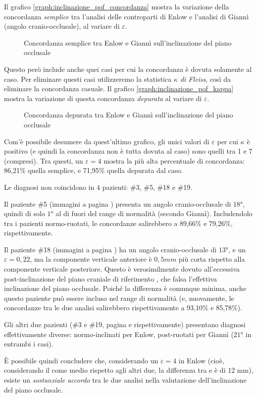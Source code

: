 Il grafico \vref{graph:inclinazione_pof_concordanza} mostra la variazione della concordanza \emph{semplice} tra l'analisi delle controparti di Enlow e l'analisi di Giannì (angolo cranio-occlusale), al variare di $\varepsilon$.

\begin{figure}[ht!]
\centering

\caption{Concordanza semplice tra Enlow e Giannì sull'inclinazione del piano occlusale}
\label{graph:inclinazione_pof_concordanza}
\end{figure}

Questo però include anche quei casi per cui la concordanza è dovuta solamente al caso. Per eliminare questi casi utilizzeremo la statistica \emph{$\kappa$ di Fleiss}, così da eliminare la concordanza casuale. Il grafico \vref{graph:inclinazione_pof_kappa} mostra la variazione di questa concordanza \emph{depurata} al variare di $\varepsilon$.

\begin{figure}[ht!]
\centering

\caption{Concordanza depurata tra Enlow e Giannì sull'inclinazione del piano occlusale}
\label{graph:inclinazione_pof_kappa}
\end{figure}

Com'è possibile desumere da quest'ultimo grafico, gli unici valori di $\varepsilon$ per cui $\kappa$ è positivo (e quindi la concordanza non è tutta dovuta al caso) sono quelli tra 1 e 7 (compresi). Tra questi, un $\varepsilon = 4$ mostra la più alta percentuale di concordanza: 86,21\% quella semplice, e 71,95\% quella depurata dal caso.

Le diagnosi non coincidono in $4$ pazienti: \#3, \#5, \#18 e \#19.

Il paziente \#5 (immagini a pagina \pageref{paz:EMALO2001}) presenta un angolo cranio-occlusale di $18°$, quindi di solo $1°$ al di fuori del range di normalità (secondo Giannì). Includendolo tra i pazienti normo-ruotati, le concordanze salirebbero a 89,66\% e 79,26\%, rispettivamente.

Il paziente \#18 (immagini a pagina \pageref{paz:TILO1999}) ha un angolo cranio-occlusale di $13°$, e un $\varepsilon = 0,\overline{22}$, ma la componente verticale anteriore è $0,5 mm$ più corta rispetto alla componente verticale posteriore. Questo è verosimilmente dovuto all'eccessiva post-inclinazione del piano craniale di riferimento , che falsa l'effettiva inclinazione del piano occlusale. Poiché la differenza è comunque minima, anche questo paziente può essere incluso nel range di normalità (e, nuovamente, le concordanze tra le due analisi salirebbero rispettivamente a 93,10\% e 85,78\%).

Gli altri due pazienti (\#3 e \#19, pagina \pageref{paz:MASCHI2000} e \pageref{paz:ELITRI1998} rispettivamente) presentano diagnosi effettivamente diverse: normo-inclinati per Enlow, post-ruotati per Giannì ($21°$ in entrambi i casi).

È possibile quindi concludere che, considerando un $\varepsilon = 4$ in Enlow (cioè, considerando il  come medio rispetto agli altri due, la differenza tra  e  è di 12 mm), esiste un \emph{sostanziale accordo} tra le due analisi nella valutazione dell'inclinazione del piano occlusale.